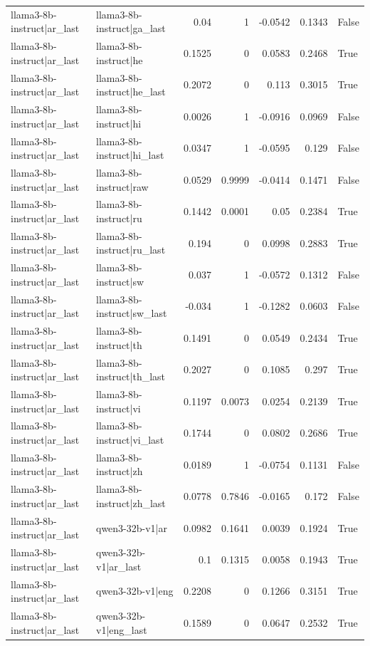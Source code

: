 \begin{table}
\begin{tabular}{l l r r r r l}
llama3-8b-instruct|ar_last & llama3-8b-instruct|ga_last & 0.04 & 1 & -0.0542 & 0.1343 & False \\
llama3-8b-instruct|ar_last & llama3-8b-instruct|he & 0.1525 & 0 & 0.0583 & 0.2468 & True \\
llama3-8b-instruct|ar_last & llama3-8b-instruct|he_last & 0.2072 & 0 & 0.113 & 0.3015 & True \\
llama3-8b-instruct|ar_last & llama3-8b-instruct|hi & 0.0026 & 1 & -0.0916 & 0.0969 & False \\
llama3-8b-instruct|ar_last & llama3-8b-instruct|hi_last & 0.0347 & 1 & -0.0595 & 0.129 & False \\
llama3-8b-instruct|ar_last & llama3-8b-instruct|raw & 0.0529 & 0.9999 & -0.0414 & 0.1471 & False \\
llama3-8b-instruct|ar_last & llama3-8b-instruct|ru & 0.1442 & 0.0001 & 0.05 & 0.2384 & True \\
llama3-8b-instruct|ar_last & llama3-8b-instruct|ru_last & 0.194 & 0 & 0.0998 & 0.2883 & True \\
llama3-8b-instruct|ar_last & llama3-8b-instruct|sw & 0.037 & 1 & -0.0572 & 0.1312 & False \\
llama3-8b-instruct|ar_last & llama3-8b-instruct|sw_last & -0.034 & 1 & -0.1282 & 0.0603 & False \\
llama3-8b-instruct|ar_last & llama3-8b-instruct|th & 0.1491 & 0 & 0.0549 & 0.2434 & True \\
llama3-8b-instruct|ar_last & llama3-8b-instruct|th_last & 0.2027 & 0 & 0.1085 & 0.297 & True \\
llama3-8b-instruct|ar_last & llama3-8b-instruct|vi & 0.1197 & 0.0073 & 0.0254 & 0.2139 & True \\
llama3-8b-instruct|ar_last & llama3-8b-instruct|vi_last & 0.1744 & 0 & 0.0802 & 0.2686 & True \\
llama3-8b-instruct|ar_last & llama3-8b-instruct|zh & 0.0189 & 1 & -0.0754 & 0.1131 & False \\
llama3-8b-instruct|ar_last & llama3-8b-instruct|zh_last & 0.0778 & 0.7846 & -0.0165 & 0.172 & False \\
llama3-8b-instruct|ar_last & qwen3-32b-v1|ar & 0.0982 & 0.1641 & 0.0039 & 0.1924 & True \\
llama3-8b-instruct|ar_last & qwen3-32b-v1|ar_last & 0.1 & 0.1315 & 0.0058 & 0.1943 & True \\
llama3-8b-instruct|ar_last & qwen3-32b-v1|eng & 0.2208 & 0 & 0.1266 & 0.3151 & True \\
llama3-8b-instruct|ar_last & qwen3-32b-v1|eng_last & 0.1589 & 0 & 0.0647 & 0.2532 & True \\

\end{tabular}
\end{table}
